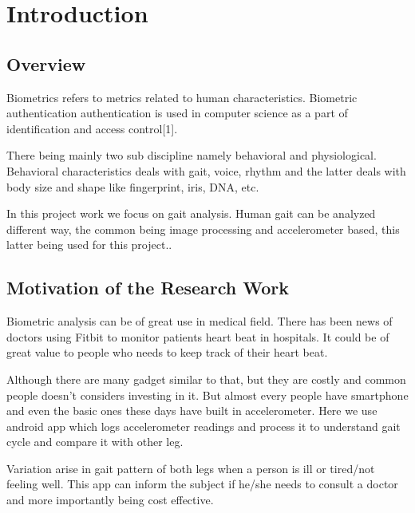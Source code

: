 \documentclass[a4paper]{report}
\begin{document}
\tableofcontents

\listoffigures


\chapter{Introduction}

\section{Overview}


Biometrics refers to metrics related to human characteristics. Biometric authentication authentication is used in computer science as a part of identification and access control[1]. \newline


There being mainly two sub discipline namely behavioral and physiological. Behavioral characteristics deals with gait, voice, rhythm and the latter deals with body size and shape like fingerprint, iris, DNA, etc.\newline

In this project work we focus on gait analysis. Human gait can be analyzed different way, the common being image processing and accelerometer based, this latter being used for this project..\\


\section{Motivation of the Research Work}


Biometric analysis can be of great use in medical field. There has been news of doctors using Fitbit to monitor patients heart beat in hospitals. It could be of great value to people who needs to keep track of their heart beat. \newline

Although there are many gadget similar to that, but they are costly and common people doesn’t considers investing in it. But almost every people have smartphone and even the basic ones these days have built in accelerometer. Here we use android app which logs accelerometer readings and process it to understand gait cycle and compare it with other leg.\newline

Variation arise in gait pattern of both legs when a person is ill or tired/not feeling well. This app can inform the subject if he/she needs to consult a doctor and more importantly being cost effective.
\newpage
\end{document}
